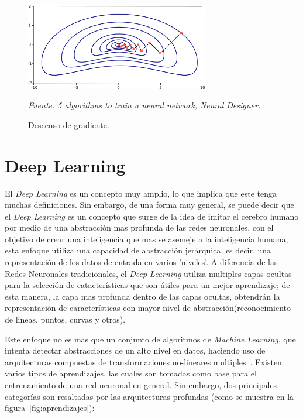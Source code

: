 \begin{figure}[H]
		\centering
		\includegraphics[width=80mm]{Imagenes/back_propagation.png}
		\caption{Descenso de gradiente.}
		\vspace{0.15cm}
		\textit{Fuente: 5 algorithms to train a neural network, Neural Designer.}
		\label{fig:back_propagation}
\end{figure}


\section{Deep Learning}
El \textit{Deep Learning} es un concepto muy amplio, lo que implica que este tenga muchas definiciones. Sin embargo, de una forma muy general, se puede decir que el \textit{Deep Learning} es un concepto que surge de la idea de imitar el cerebro humano por medio de una abstracción mas profunda de las redes neuronales, con el objetivo de crear una inteligencia que mas se asemeje a la inteligencia humana, esta enfoque utiliza una capacidad de abstracción jerárquica, es decir, una representación de los datos de entrada en varios 'niveles'. A diferencia de las Redes Neuronales tradicionales, el \textit{Deep Learning} utiliza multiples capas ocultas para la selección de catacterísticas que son útiles para un mejor aprendizaje; de esta manera, la capa mas profunda dentro de las capas ocultas, obtendrán la representación de características con mayor nivel de abstracción(reconocimiento de lineas, puntos, curvas y otros).

Este enfoque no es mas que un conjunto de algoritmos de \textit{Machine Learning}, que intenta detectar abstracciones de un alto nivel en datos, haciendo uso de arquitecturas compuestas de transformaciones no-lineares multiples~\cite{17bengio2013representation}. Existen varios tipos de aprendizajes, las cuales son tomadas como base para el entrenamiento de una red neuronal en general. Sin embargo, dos principales categorías son resaltadas por las arquitecturas profundas (como se muestra en la figura~\ref{fig:aprendizajes}):

